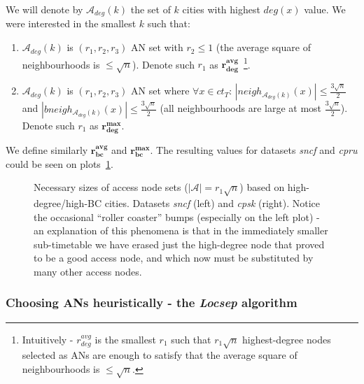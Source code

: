 		\noindent We will denote by $\mathcal{A}_{deg}(k)$ the set of $k$ cities with highest $deg(x)$ value. We were interested in the smallest $k$ such that:
		\begin{enumerate}
			\item $\mathcal{A}_{deg}(k)$ is $(r_{1}, r_{2}, r_{3})$ AN set with $r_{2} \leq 1$ (the average square of neighbourhoods is $\leq \sqrt{n}$). Denote such $r_{1}$ as $\bm{r_{deg}^{avg}}$~\footnote{Intuitively - $r_{deg}^{avg}$ is the smallest $r_{1}$ such that $r_{1}\sqrt{n}$ highest-degree nodes selected as ANs are enough to satisfy that the average square of neighbourhoods is $\leq \sqrt{n}$.}.
			\item $\mathcal{A}_{deg}(k)$ is $(r_{1}, r_{2}, r_{3})$ AN set where $\forall x \in ct_{T}$: $|neigh_{\mathcal{A}_{deg}(k)}(x)| \leq \frac{3\sqrt{n}}{2}$ and $|bneigh_{\mathcal{A}_{deg}(k)}(x)| \leq \frac{3\sqrt{n}}{2}$ (all neighbourhoods are large at most $\frac{3\sqrt{n}}{2}$). Denote such $r_{1}$ as $\bm{r_{deg}^{max}}$.
		\end{enumerate}		 
		\hspace*{\fill}
		
		\noindent We define similarly $\bm{r_{bc}^{avg}}$ and $\bm{r_{bc}^{max}}$. The resulting values for datasets \textit{sncf} and \textit{cpru} could be seen on plots~\ref{plot:hbcdeg-size}.
		
		\begin{figure}[htb]
		\centering
	    \caption{\label{plot:hbcdeg-size} Necessary sizes of access node sets ($|\mathcal{A}| = r_{1} \sqrt{n}$) based on high-degree/high-BC cities. Datasets \textit{sncf} (left) and \textit{cpsk} (right). Notice the occasional ``roller coaster'' bumps (especially on the left plot) - an explanation of this phenomena is that in the immediately smaller sub-timetable we have erased just the high-degree node that proved to be a good access node, and which now must be substituted by many other access nodes.}
		\end{figure}
		
	\subsubsection{Choosing ANs heuristically - the \textit{Locsep} algorithm}
	
